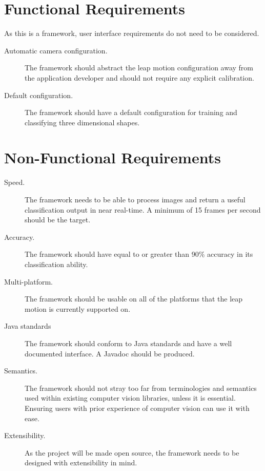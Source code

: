 \documentclass[11pt,oneside]{report}
\begin{document}
		\section{Functional Requirements}
			
			As this is a framework, user interface requirements do not need to be considered.
			\begin{description}
				\item[Automatic camera configuration.] The framework should abstract the leap motion configuration away from the application developer and should not require any explicit calibration.
				\item[Default configuration.] The framework should have a default configuration for training and classifying three dimensional shapes.
			\end{description}
				
			
		\section{Non-Functional Requirements}
			\begin{description}
				\item[Speed.] The framework needs to be able to process images and return a useful classification output in near real-time. 
				A minimum of 15 frames per second should be the target.
				\item[Accuracy.] The framework should have equal to or greater than 90\% accuracy in its classification ability.
				\item[Multi-platform.] The framework should be usable on all of the platforms that the leap motion is currently supported on.
				\item[Java standards] The framework should conform to Java standards and have a well documented interface.
				A Javadoc should be produced.
				\item[Semantics.] The framework should not stray too far from terminologies and semantics used within existing computer vision libraries, unless it is essential. Ensuring users with prior experience of computer vision can use it with ease.
				\item[Extensibility.] As the project will be made open source, the framework needs to be designed with extensibility in mind.
			\end{description}
			
\end{document}
